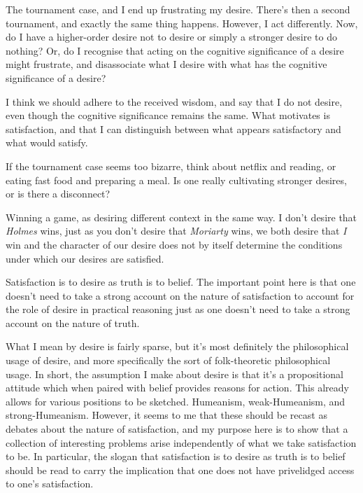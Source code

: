 \documentclass[10pt]{article}
\begin{document}
The tournament case, and I end up frustrating my desire.
There's then a second tournament, and exactly the same thing happens.
However, I act differently.
Now, do I have a higher-order desire not to desire or simply a stronger desire to do nothing?
Or, do I recognise that acting on the cognitive significance of a desire might frustrate, and disassociate what I desire with what has the cognitive significance of a desire?

I think we should adhere to the received wisdom, and say that I do not desire, even though the cognitive significance remains the same.
What motivates is satisfaction, and that I can distinguish between what appears satisfactory and what would satisfy.

If the tournament case seems too bizarre, think about netflix and reading, or eating fast food and preparing a meal.
Is one really cultivating stronger desires, or is there a disconnect?





Winning a game, as desiring different context in the same way.
I don't desire that \emph{Holmes} wins, just as you don't desire that \emph{Moriarty} wins, we both desire that \emph{I} win and the character of our desire does not by itself determine the conditions under which our desires are satisfied.



Satisfaction is to desire as truth is to belief.
The important point here is that one doesn't need to take a strong account on the nature of satisfaction to account for the role of desire in practical reasoning just as one doesn't need to take a strong account on the nature of truth.

What I mean by desire is fairly sparse, but it's most definitely the philosophical usage of desire, and more specifically the sort of folk-theoretic philosophical usage.
In short, the assumption I make about desire is that it's a propositional attitude which when paired with belief provides reasons for action.
This already allows for various positions to be sketched.
Humeanism, weak-Humeanism, and strong-Humeanism.
However, it seems to me that these should be recast as debates about the nature of satisfaction, and my purpose here is to show that a collection of interesting problems arise independently of what we take satisfaction to be.
In particular, the slogan that satisfaction is to desire as truth is to belief should be read to carry the implication that one does not have privelidged access to one's satisfaction.
\end{document}
